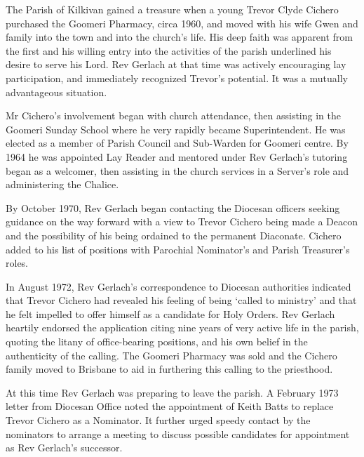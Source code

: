 The Parish of Kilkivan gained a treasure when a young Trevor Clyde Cichero purchased the Goomeri Pharmacy, circa 1960, and moved with his wife Gwen and family into the town and into the church's life. His deep faith was apparent from the first and his willing entry into the activities of the parish underlined his desire to serve his Lord. Rev Gerlach at that time was actively encouraging lay participation, and immediately recognized Trevor's potential. It was a mutually advantageous situation.



Mr Cichero's involvement began with church attendance, then assisting in the Goomeri Sunday School where he very rapidly became Superintendent. He was elected as a member of Parish Council and Sub-Warden for Goomeri centre. By 1964 he was appointed Lay Reader and mentored under Rev Gerlach's tutoring began as a welcomer, then assisting in the church services in a Server's role and administering the Chalice.



By October 1970, Rev Gerlach began contacting the Diocesan officers seeking guidance on the way forward with a view to Trevor Cichero being made a Deacon and the possibility of his being ordained to the permanent Diaconate. Cichero added to his list of positions with Parochial Nominator's and Parish Treasurer's roles.



In August 1972, Rev Gerlach's correspondence to Diocesan authorities indicated that Trevor Cichero had revealed his feeling of being `called to ministry' and that he felt impelled to offer himself as a candidate for Holy Orders. Rev Gerlach heartily endorsed the application citing nine years of very active life in the parish, quoting the litany of office-bearing positions, and his own belief in the authenticity of the calling. The Goomeri Pharmacy was sold and the Cichero family moved to Brisbane to aid in furthering this calling to the priesthood.



At this time Rev Gerlach was preparing to leave the parish. A February 1973 letter from Diocesan Office noted the appointment of Keith Batts to replace Trevor Cichero as a Nominator. It further urged speedy contact by the nominators to arrange a meeting to discuss possible candidates for appointment as Rev Gerlach's successor.



